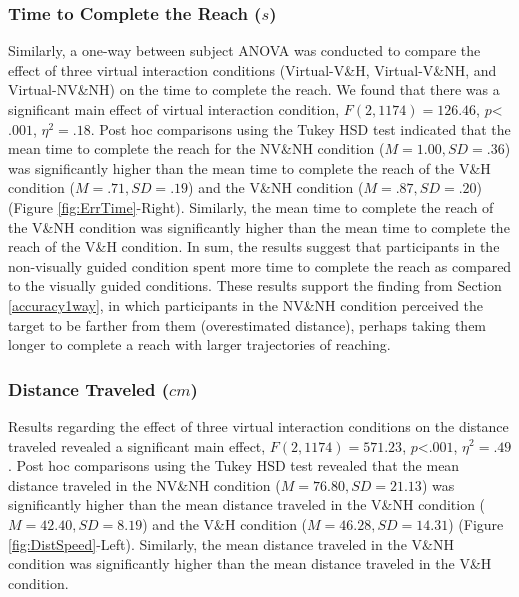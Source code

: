 \subsubsection{Time to Complete the Reach ($s$)}
Similarly, a one-way between subject ANOVA was conducted to compare the effect of three virtual interaction conditions (Virtual-V\&H, Virtual-V\&NH, and Virtual-NV\&NH) on the time to complete the reach. We found that there was a significant main effect of virtual interaction condition, $F(2,1174)=126.46$, $p$\textless$.001$, $\eta^{2}=.18$. Post hoc comparisons using the Tukey HSD test indicated that the mean time to complete the reach for the NV\&NH condition ($M=1.00, SD=.36$) was significantly higher than the mean time to complete the reach of the V\&H condition ($M=.71, SD=.19$) and the V\&NH condition ($M=.87, SD=.20$) (Figure \ref{fig:ErrTime}-Right). Similarly, the mean time to complete the reach of the V\&NH condition was significantly higher than the mean time to complete the reach of the V\&H condition. In sum, the results suggest that participants in the non-visually guided condition spent more time to complete the reach as compared to the visually guided conditions. These results support the finding from Section \ref{accuracy1way}, in which participants in the NV\&NH condition perceived the target to be farther from them (overestimated distance), perhaps taking them longer to complete a reach with larger trajectories of reaching.

\subsubsection{Distance Traveled ($cm$)}
Results regarding the effect of three virtual interaction conditions on the distance traveled revealed a significant main effect, $F(2,1174)=571.23$, $p$\textless$.001$, $\eta^{2}=.49$. Post hoc comparisons using the Tukey HSD test revealed that the mean distance traveled in the NV\&NH condition ($M=76.80, SD=21.13$) was significantly higher than the mean distance traveled in the V\&NH condition ($M=42.40, SD=8.19$) and the V\&H condition ($M=46.28, SD=14.31$) (Figure \ref{fig:DistSpeed}-Left). Similarly, the mean distance traveled in the V\&NH condition was significantly higher than the mean distance traveled in the V\&H condition.  

